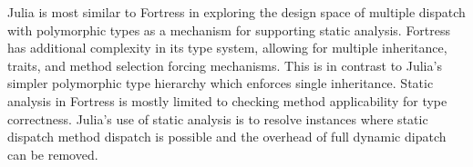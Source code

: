 Julia is most similar to Fortress in exploring the design space of multiple dispatch with polymorphic types as a mechanism for supporting static analysis. Fortress has additional complexity in its type system, allowing for multiple inheritance, traits, and method selection forcing mechanisms.  This is in contrast to Julia's simpler polymorphic type hierarchy which enforces single inheritance. Static analysis in Fortress is mostly limited to checking method applicability for type correctness.  Julia's use of static analysis is to resolve instances where static dispatch method dispatch is possible and the overhead of full dynamic dipatch can be removed.



